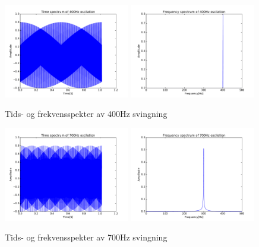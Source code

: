 \documentclass[12p,a4paper]{article}
\begin{document}
\begin{figure}[H]
\centering
\includegraphics[width=0.49\textwidth]{fig/timespec400.pdf}
\includegraphics[width=0.49\textwidth]{fig/freqspec400.pdf}
\caption{Tids- og frekvensspekter av 400Hz svingning}
\label{fig:400Hz}
\end{figure}
\begin{figure}[H]
\centering
\includegraphics[width=0.49\textwidth]{fig/timespec700.pdf}
\includegraphics[width=0.49\textwidth]{fig/freqspec700.pdf}
\caption{Tids- og frekvensspekter av 700Hz svingning}
\label{fig:700Hz}
\end{figure}
\end{document}
